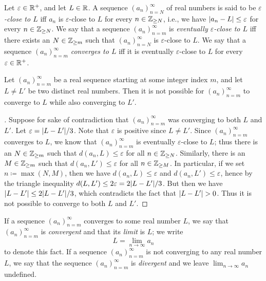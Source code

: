\begin{defn}\label{i:6.1.5}
  Let \(\varepsilon \in \mathbb{R}^+\), and let \(L \in \mathbb{R}\).
  A sequence \((a_n)_{n = N}^\infty\) of real numbers is said to be \emph{\(\varepsilon\)-close to \(L\)} iff \(a_n\) is \(\varepsilon\)-close to \(L\) for every \(n \in \mathbb{Z}_{\geq N}\), i.e., we have \(\left\lvert a_n - L\right\rvert \leq \varepsilon\) for every \(n \in \mathbb{Z}_{\geq N}\).
  We say that a sequence \((a_n)_{n = m}^\infty\) is \emph{eventually \(\varepsilon\)-close to \(L\)} iff there exists an \(N \in \mathbb{Z}_{\geq m}\) such that \((a_n)_{n = N}^\infty\) is \(\varepsilon\)-close to \(L\).
  We say that a sequence \((a_n)_{n = m}^\infty\) \emph{converges to \(L\)} iff it is eventually \(\varepsilon\)-close to \(L\) for every \(\varepsilon \in \mathbb{R}^+\).
\end{defn}

\setcounter{thm}{6}
\begin{prop}\label{i:6.1.7}
  Let \((a_n)_{n = m}^\infty\) be a real sequence starting at some integer index \(m\), and let \(L \neq L'\) be two distinct real numbers.
  Then it is not possible for \((a_n)_{n = m}^\infty\) to converge to \(L\) while also converging to \(L'\).
\end{prop}

\begin{proof}[]
  Suppose for sake of contradiction that \((a_n)_{n = m}^\infty\) was converging to both \(L\) and \(L'\).
  Let \(\varepsilon = \abs{L - L'} / 3\).
  Note that \(\varepsilon\) is positive since \(L \neq L'\).
  Since \((a_n)_{n = m}^\infty\) converges to \(L\), we know that \((a_n)_{n = m}^\infty\) is eventually \(\varepsilon\)-close to \(L\);
  thus there is an \(N \in \mathbb{Z}_{\geq m}\) such that \(d(a_n, L) \leq \varepsilon\) for all \(n \in \mathbb{Z}_{\geq N}\).
  Similarly, there is an \(M \in \mathbb{Z}_{\geq m}\) such that \(d(a_n, L') \leq \varepsilon\) for all \(n \in \mathbb{Z}_{\geq M}\).
  In particular, if we set \(n \coloneqq \max(N, M)\), then we have \(d(a_n, L) \leq \varepsilon\) and \(d(a_n, L') \leq \varepsilon\), hence by the triangle inequality \(d(L, L') \leq 2\varepsilon = 2\abs{L - L'} / 3\).
  But then we have \(\abs{L - L'} \leq 2\abs{L - L'} / 3\), which contradicts the fact that \(\left\lvert L - L'\right\rvert > 0\).
  Thus it is not possible to converge to both \(L\) and \(L'\).
\end{proof}

\begin{defn}\label{i:6.1.8}
  If a sequence \((a_n)_{n = m}^\infty\) converges to some real number \(L\), we say that \((a_n)_{n = m}^\infty\) is \emph{convergent} and that its \emph{limit} is \(L\);
  we write
  \[
    L = \lim_{n \to \infty} a_n
  \]
  to denote this fact.
  If a sequence \((a_n)_{n = m}^\infty\) is not converging to any real number \(L\), we say that the sequence \((a_n)_{n = m}^\infty\) is \emph{divergent} and we leave \(\lim_{n \to \infty} a_n\) undefined.
\end{defn}

